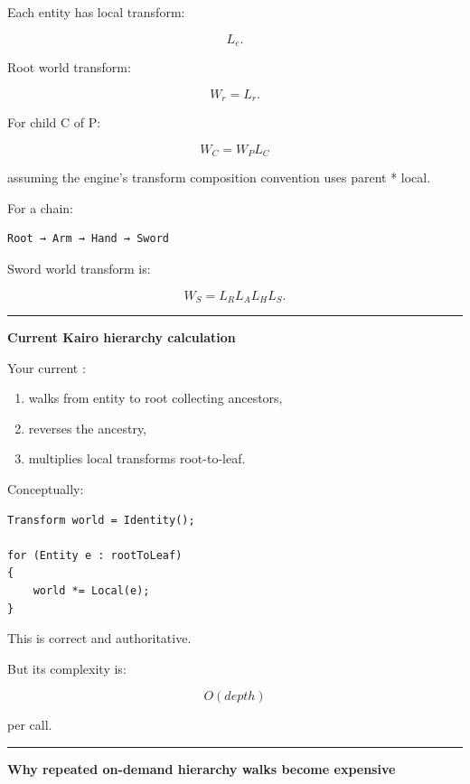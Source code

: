 Each entity has local transform:

\[
L_e.
\]

Root world transform:

\[
W_r=L_r.
\]

For child C of P:

\[
\boxed{
W_C=W_P L_C
}
\]

assuming the engine's transform composition convention uses parent * local.

For a chain:

\begin{verbatim}
Root → Arm → Hand → Sword
\end{verbatim}

Sword world transform is:

\[
W_S=
L_RL_AL_HL_S.
\]

\begin{center}\rule{0.5\linewidth}{0.5pt}\end{center}

\textbf{Current Kairo hierarchy calculation}

Your current :

\begin{enumerate}
\def\labelenumi{\arabic{enumi}.}
\tightlist
\item
  walks from entity to root collecting ancestors,
\item
  reverses the ancestry,
\item
  multiplies local transforms root-to-leaf.
\end{enumerate}

Conceptually:

\begin{verbatim}
Transform world = Identity();

for (Entity e : rootToLeaf)
{
    world *= Local(e);
}
\end{verbatim}

This is correct and authoritative.

But its complexity is:

\[
O(depth)
\]

per call.

\begin{center}\rule{0.5\linewidth}{0.5pt}\end{center}

\textbf{Why repeated on-demand hierarchy walks become expensive}

